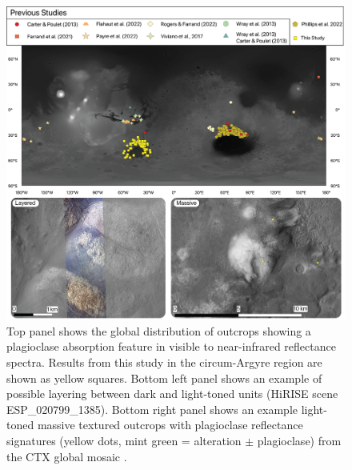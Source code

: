 \documentclass[11pt]{article}
\begin{document}
\begin{figure}
    \centering
    \includegraphics[width=\textwidth]
    {figures/01_Global_Context.png}
    \caption{Top panel shows the global distribution of outcrops showing a plagioclase absorption feature in visible to near-infrared reflectance spectra. Results from this study in the circum-Argyre region are shown as yellow squares. Bottom left panel shows an example of possible layering between dark and light-toned units (HiRISE scene ESP\_020799\_1385). Bottom right panel shows an example light-toned massive textured outcrops with plagioclase reflectance signatures (yellow dots, mint green = alteration $\pm$ plagioclase) from the CTX global mosaic \citep{Dickson2018}.}
    \label{fig:global_distribution}
\end{figure}
\end{document}

